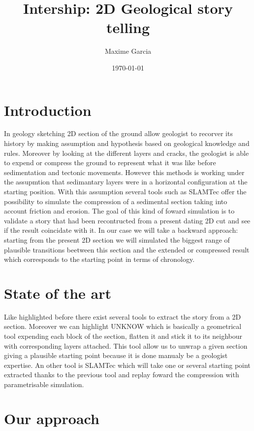 \documentclass[a4paper,11pt]{article}
\title{Intership: 2D Geological story telling}
\author{Maxime Garcia}
\date{\today}
\begin{document}
\maketitle
\section{Introduction}

In geology sketching 2D section of the ground allow geologist to recorver its history by making assumption and hypothesis based on geological knowledge and rules. Moreover by looking at the different layers and cracks, the geologist is able to expend or compress the ground to represent what it was like before sedimentation and tectonic movements. 
However this methods is working under the assupmtion that sedimantary layers were in a horizontal configuration at the starting position. With this assumption several tools such as SLAMTec offer the possibility to simulate the compression of a sedimental section taking into account friction and erosion. The goal of this kind of foward simulation is to validate a story that had been recontructed from a present dating 2D cut and see if the result coincidate with it.
In our case we will take a backward approach: starting from the present 2D section we will simulated the biggest range of plausible transitions beetween this section and the extended or compressed result which corresponds to the starting point in terms of chronology.

\section{State of the art}

Like highlighted before there exist several tools to extract the story from a 2D section. Moreover we can highlight UNKNOW which is basically a geometrical tool expending each block of the section, flatten it and stick it to its neighbour with corresponding layers attached. This tool allow us to unwrap a given section giving a plausible starting point because it is done manualy be a geologist expertise. 
An other tool is SLAMTec which will take one or several starting point extracted thanks to the previous tool and replay foward the compression with parametrisable simulation. 

\section{Our approach}
\end{document}
